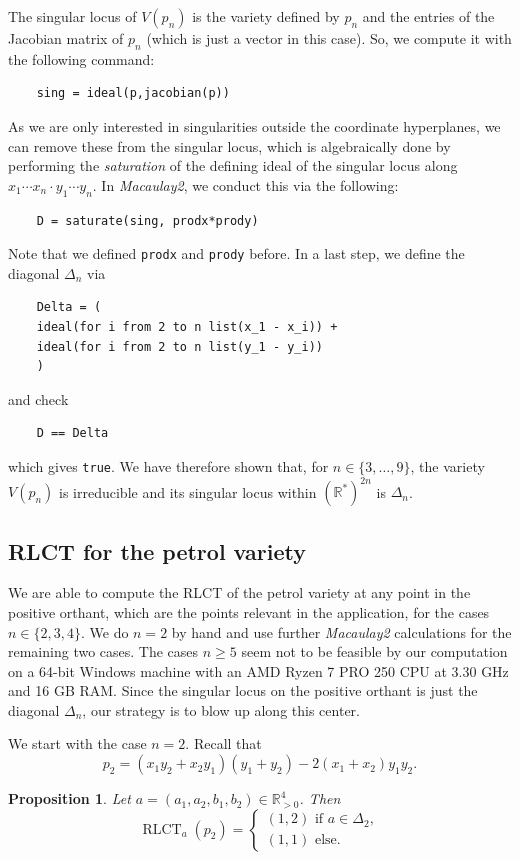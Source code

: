 \documentclass[11pt]{amsart}
\DeclareMathOperator{\rlct}{RLCT}
\numberwithin{equation}{section}
\theoremstyle{plain}
\newtheorem{proposition}[theorem]{Proposition}
\theoremstyle{definition}
\newcommand{\R}{\mathbb{R}}
\newcommand{\gt}{>}
\begin{document}
The singular locus of $V(p_n)$ is the variety defined by $p_n$ and the entries of the Jacobian matrix of $p_n$ (which is just a vector in this case). So, we compute it with the following command:
\begin{verbatim}
    sing = ideal(p,jacobian(p))
\end{verbatim}
As we are only interested in singularities outside the coordinate hyperplanes, we can remove these from the singular locus, which is algebraically done by performing the \emph{saturation} of the defining ideal of the singular locus along $x_1\cdots x_n\cdot y_1\cdots y_n$. In \emph{Macaulay2}, we conduct this via the following:
\begin{verbatim}
    D = saturate(sing, prodx*prody)
\end{verbatim}
Note that we defined \texttt{prodx} and \texttt{prody} before. In a last step, we define the diagonal $\Delta_n$ via
\begin{verbatim}
    Delta = (
    ideal(for i from 2 to n list(x_1 - x_i)) + 
    ideal(for i from 2 to n list(y_1 - y_i))
    )
\end{verbatim}
and check
\begin{verbatim}
    D == Delta
\end{verbatim}
which gives \texttt{true}. We have therefore shown that, for $n \in \{3,\ldots,9\}$, the variety $V(p_n)$ is irreducible and its singular locus within $(\R^*)^{2n}$ is $\Delta_n$. 

\subsection{RLCT for the petrol variety} We are able to compute the RLCT of the petrol variety at any point in the positive orthant, which are the points relevant in the application, for the cases $n \in \{2,3,4\}$. We do $n=2$ by hand and use further \textit{Macaulay2} calculations for the remaining two cases. The cases $n \geq 5$ seem not to be feasible by our computation on a 64-bit Windows machine with an AMD Ryzen 7 PRO 250 CPU
at 3.30 GHz and 16 GB RAM. Since the singular locus on the positive orthant is just the diagonal $\Delta_n$, our strategy is to blow up along this center.

We start with the case $n=2$. Recall that
\[
p_2 = (x_1y_2 + x_2y_1)(y_1 + y_2) - 2(x_1+x_2)y_1y_2.
\]

\begin{proposition}\label{prop:petrol2}
    Let $a = (a_1,a_2,b_1,b_2) \in \R_{\gt 0}^{4}$. Then
    \[
    \rlct_a(p_2) = \begin{cases}
        (1,2) \text{ if } a \in \Delta_2, \\
        (1,1) \text{ else}.
    \end{cases}
    \]
\end{proposition}
\end{document}

